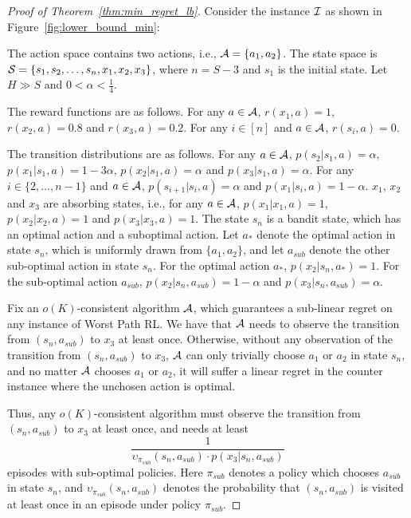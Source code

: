 \begin{proof}[Proof of Theorem~\ref{thm:min_regret_lb}]
	Consider the instance $\mathcal{I}$ as shown in Figure~\ref{fig:lower_bound_min}:
	
	The action space contains two actions, i.e., $\mathcal{A}=\{a_1,a_2\}$.
	The state space is $\mathcal{S}=\{s_1,s_2,\dots,s_n,x_1,x_2,x_3\}$, where $n=S-3$ and $s_1$ is the initial state. Let $H \gg S$ and $0<\alpha<\frac{1}{4}$.
	
	The reward functions are as follows.
	For any $a \in \mathcal{A}$, $r(x_1,a)=1$, $r(x_2,a)=0.8$ and $r(x_3,a)=0.2$. For any $i \in [n]$ and $a \in \mathcal{A}$, $r(s_i,a)=0$.
	
	The transition distributions are as follows.
	For any $a \in \mathcal{A}$, $p(s_2|s_1,a)=\alpha$, $p(x_1|s_1,a)=1-3\alpha$, $p(x_2|s_1,a)=\alpha$ and $p(x_3|s_1,a)=\alpha$.
	For any $i\in\{2,\dots,n-1\}$ and $a \in \mathcal{A}$,
	$p(s_{i+1}|s_i,a)=\alpha$ and $p(x_1|s_i,a)=1-\alpha$.
	$x_1$, $x_2$ and $x_3$ are absorbing states, i.e., for any $a \in \mathcal{A}$, $p(x_1|x_1,a)=1$, $p(x_2|x_2,a)=1$ and $p(x_3|x_3,a)=1$.
	The state $s_n$ is a bandit state, which has an optimal action and a suboptimal action.
	Let $a_*$ denote the optimal action in state $s_n$, which is uniformly drawn from $\{a_1,a_2\}$, and let $a_{sub}$ denote the other sub-optimal action in state $s_n$.
	For the optimal action $a_*$, $p(x_2|s_n,a_*)=1$.
	For the sub-optimal action $a_{sub}$, $p(x_2|s_n,a_{sub})=1-\alpha$ and $p(x_3|s_n,a_{sub})=\alpha$.
	
	
	
	Fix an $o(K)$-consistent algorithm $\mathcal{A}$, which guarantees a sub-linear regret on any instance of Worst Path RL. 
	We have that $\mathcal{A}$ needs to observe the transition from $(s_n,a_{sub})$ to $x_3$ at least once.
	Otherwise, without any observation of the transition from $(s_n,a_{sub})$ to $x_3$,   $\mathcal{A}$ can only trivially choose $a_1$ or $a_2$ in state $s_n$, and no matter $\mathcal{A}$ chooses $a_1$ or $a_2$, it will suffer a linear regret in the counter instance where the unchosen action is optimal.
	
	
	
	Thus, any $o(K)$-consistent algorithm must observe the transition from $(s_n,a_{sub})$ to $x_3$ at least once, and needs at least
	$$
	\frac{1}{\upsilon_{\pi_{sub}}(s_n,a_{sub}) \cdot p(x_3|s_n,a_{sub})}
	$$
	episodes with sub-optimal policies. 
	Here $\pi_{sub}$ denotes a policy which chooses $a_{sub}$ in state $s_n$, and $\upsilon_{\pi_{sub}}(s_n,a_{sub})$ denotes the probability that $(s_n,a_{sub})$ is visited at least once in an episode under policy $\pi_{sub}$.
	

\end{proof}
